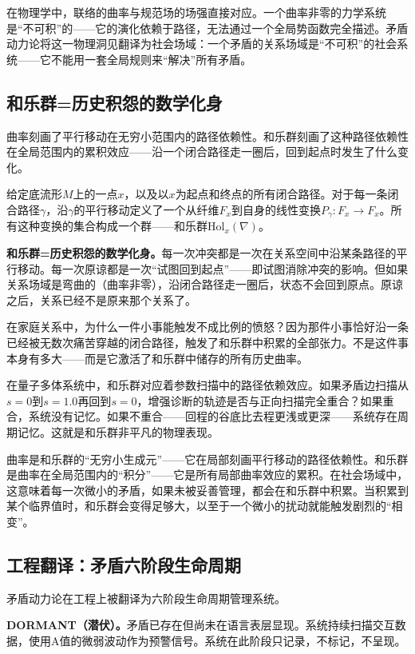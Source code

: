 \documentclass[11pt,a4paper]{book}
\theoremstyle{definition}
\begin{document}
在物理学中，联络的曲率与规范场的场强直接对应。一个曲率非零的力学系统是“不可积”的——它的演化依赖于路径，无法通过一个全局势函数完全描述。矛盾动力论将这一物理洞见翻译为社会场域：一个矛盾的关系场域是“不可积”的社会系统——它不能用一套全局规则来“解决”所有矛盾。

\subsection{和乐群=历史积怨的数学化身}

曲率刻画了平行移动在无穷小范围内的路径依赖性。和乐群刻画了这种路径依赖性在全局范围内的累积效应——沿一个闭合路径走一圈后，回到起点时发生了什么变化。

给定底流形$M$上的一点$x$，以及以$x$为起点和终点的所有闭合路径。对于每一条闭合路径$\gamma$，沿$\gamma$的平行移动定义了一个从纤维$F_x$到自身的线性变换$P_\gamma: F_x \to F_x$。所有这种变换的集合构成一个群——和乐群$\text{Hol}_x(\nabla)$。

\textbf{和乐群=历史积怨的数学化身。}每一次冲突都是一次在关系空间中沿某条路径的平行移动。每一次原谅都是一次“试图回到起点”——即试图消除冲突的影响。但如果关系场域是弯曲的（曲率非零），沿闭合路径走一圈后，状态不会回到原点。原谅之后，关系已经不是原来那个关系了。

在家庭关系中，为什么一件小事能触发不成比例的愤怒？因为那件小事恰好沿一条已经被无数次痛苦穿越的闭合路径，触发了和乐群中积累的全部张力。不是这件事本身有多大——而是它激活了和乐群中储存的所有历史曲率。

在量子多体系统中，和乐群对应着参数扫描中的路径依赖效应。如果矛盾边扫描从$s=0$到$s=1.0$再回到$s=0$，增强诊断的轨迹是否与正向扫描完全重合？如果重合，系统没有记忆。如果不重合——回程的谷底比去程更浅或更深——系统存在周期记忆。这就是和乐群非平凡的物理表现。

曲率是和乐群的“无穷小生成元”——它在局部刻画平行移动的路径依赖性。和乐群是曲率在全局范围内的“积分”——它是所有局部曲率效应的累积。在社会场域中，这意味着每一次微小的矛盾，如果未被妥善管理，都会在和乐群中积累。当积累到某个临界值时，和乐群会变得足够大，以至于一个微小的扰动就能触发剧烈的“相变”。

\subsection{工程翻译：矛盾六阶段生命周期}

矛盾动力论在工程上被翻译为六阶段生命周期管理系统。

\textbf{DORMANT（潜伏）。}矛盾已存在但尚未在语言表层显现。系统持续扫描交互数据，使用A值的微弱波动作为预警信号。系统在此阶段只记录，不标记，不呈现。
\end{document}

